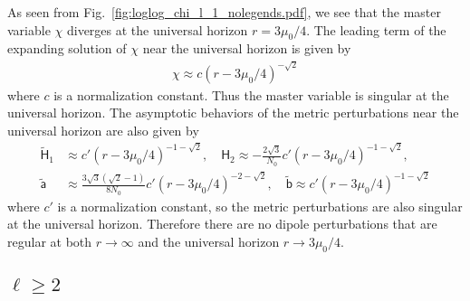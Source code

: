 \documentclass[aps,prd,preprintnumbers,superscriptaddress,nofootinbib,notitlepage]{revtex4-2}
\begin{document}
As seen from Fig.~\ref{fig:loglog_chi_l_1_nolegends.pdf}, we see that the master variable $\chi$ diverges at the universal horizon $r=3\mu_0/4$.
The leading term of the expanding solution of $\chi$ near the universal horizon is given by
\begin{align}
    \chi \approx c(r-3\mu_0/4)^{-\sqrt{2}}
\end{align}
where $c$ is a normalization constant.
Thus the master variable is singular at the universal horizon.
The asymptotic behaviors of the metric perturbations near the universal horizon are also given by
\begin{align}
    \widetilde{\mathsf H}_1&\approx c'(r-3\mu_0/4)^{-1-\sqrt 2},\quad \mathsf{H}_2\approx -\frac{2\sqrt{3}}{N_0}c'(r-3\mu_0/4)^{-1-\sqrt{2}},\\
    \widetilde{\mathsf{a}}&\approx\frac{3\sqrt{3}(\sqrt{2}-1)}{8N_0}c'(r-3\mu_0/4)^{-2-\sqrt{2}},\quad\widetilde{\mathsf{b}}\approx c'(r-3\mu_0/4)^{-1-\sqrt{2}}
\end{align}
where $c'$ is a normalization constant, so the metric perturbations are also singular at the universal horizon.
Therefore there are no dipole perturbations that are regular at both $r\rightarrow \infty$ and the universal horizon $r\rightarrow 3\mu_0/4$.
\fi 


\subsection{$\ell\ge 2$}\label{even-parity:l>=2}
\end{document}
